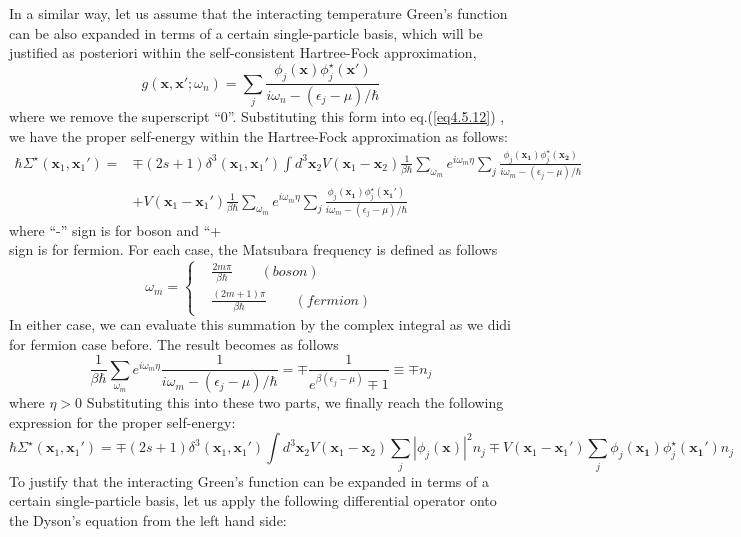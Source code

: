 In a similar way, let us assume that the interacting temperature Green's function can be also expanded in terms of a certain single-particle basis, which will be justified as posteriori within the self-consistent Hartree-Fock approximation,
\begin{equation}\label{eq4.5.21}
g(\mathbf{x},\mathbf{x}';\omega_n)=\sum_j \frac{\phi_j(\mathbf{x})\phi_j^{\star}(\mathbf{x}')}{i\omega_n-(\epsilon_j-\mu)/\hbar}
\end{equation}
where we remove the superscript ``0''.
Substituting this form into eq.(\ref{eq4.5.12}) , we have the proper self-energy within the Hartree-Fock approximation as follows:
\[
\begin{aligned}
\hbar \Sigma^\star(\mathbf{x}_1,\mathbf{x}_1')
=&\mp (2s+1)\delta^3 (\mathbf{x}_1,\mathbf{x}_1') \int d^3\mathbf{x}_2 V(\mathbf{x}_1-\mathbf{x}_2)\frac{1}{\beta\hbar} \sum_{\omega_m} e^{i\omega_m\eta}\sum_j \frac{\phi_j(\mathbf{x_1})\phi_j^{\star}(\mathbf{x_2})}{i\omega_m-(\epsilon_j-\mu)/\hbar}\\
&+V(\mathbf{x}_1-\mathbf{x}_1')\frac{1}{\beta\hbar} \sum_{\omega_m} e^{i\omega_m\eta}\sum_j \frac{\phi_j(\mathbf{x_1})\phi_j^{\star}(\mathbf{x_1'})}{i\omega_m-(\epsilon_j-\mu)/\hbar}
\end{aligned}
\]
where ``-'' sign is for boson and ``+\\ sign is for fermion.
For each case, the Matsubara frequency is defined as follows
\[
\omega_m=\left\{
\begin{aligned}
&\frac{2m\pi}{\beta\hbar}\qquad (boson)\\
&\frac{(2m+1)\pi}{\beta\hbar}\qquad (fermion)
\end{aligned}
\right.
\]
In either case, we can evaluate this summation by the complex integral as we didi for fermion case before.
The result becomes as follows
\[
\frac{1}{\beta\hbar} \sum_{\omega_m} e^{i\omega_m\eta} \frac{1}{i\omega_m-(\epsilon_j-\mu)/\hbar}=\mp \frac{1}{e^{\beta(\epsilon_j-\mu)}\mp1}\equiv \mp n_j
\]
where $\eta > 0$
Substituting this into these two parts, we finally reach the following expression for the proper self-energy:
\begin{equation}\label{eq4.5.22}
\hbar \Sigma^\star(\mathbf{x}_1,\mathbf{x}_1')
=\mp (2s+1)\delta^3 (\mathbf{x}_1,\mathbf{x}_1') \int d^3\mathbf{x}_2 V(\mathbf{x}_1-\mathbf{x}_2) \sum_j |\phi_j(\mathbf{x})|^2n_j\mp V(\mathbf{x}_1-\mathbf{x}_1')\sum_j \phi_j(\mathbf{x_1})\phi_j^{\star}(\mathbf{x_1'})n_j
\end{equation}
To justify that the interacting Green's function can be expanded in terms of a certain single-particle basis, let us apply the following differential operator onto the Dyson's equation from the left hand side:
